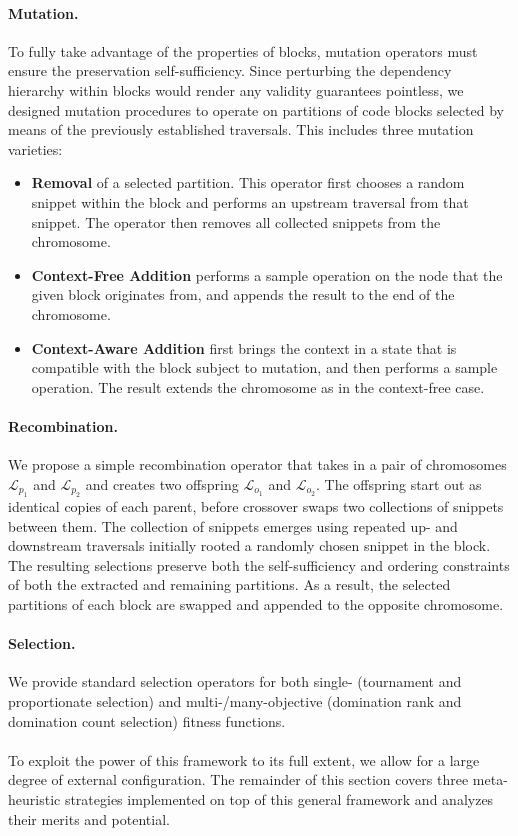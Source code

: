 \paragraph{Mutation.} To fully take advantage of the properties of blocks,
mutation operators must ensure the preservation self-sufficiency.
Since perturbing the dependency hierarchy within blocks
would render any validity guarantees pointless, we designed
mutation procedures to operate on partitions of code blocks selected by 
means of the previously established traversals.
This includes three mutation varieties:

\begin{itemize}
	\item \textbf{Removal} of a selected partition. This operator first chooses a random 
	snippet within the block and performs an upstream traversal from that snippet.
	The operator then removes all collected snippets from the chromosome.
	\item \textbf{Context-Free Addition} performs a sample operation
	on the node that the given block originates from, and appends the result to the end
	of the chromosome.
	\item \textbf{Context-Aware Addition} first brings the context in a state
	that is compatible with the block subject to mutation, and then performs a sample
	operation. The result extends the chromosome as in the context-free case.
\end{itemize}

\paragraph{Recombination.} We propose a simple recombination operator
that takes in a pair of chromosomes $\mathcal{L}_{p_1}$ and $\mathcal{L}_{p_2}$
and creates two offspring  $\mathcal{L}_{o_1}$ and $\mathcal{L}_{o_2}$.
The offspring start out as identical copies of each parent, before
crossover swaps two collections of snippets between them.
The collection of snippets emerges using repeated up- and downstream
traversals initially rooted a randomly chosen snippet in the block.
The resulting selections preserve both the self-sufficiency and
ordering constraints of both the extracted and remaining partitions.
As a result, the selected partitions of each block are swapped and appended
to the opposite chromosome.

\paragraph{Selection.} We provide standard selection operators for both
single- (tournament and proportionate selection) and
multi-/many-objective (domination rank and domination count selection) fitness functions.
\\\\
To exploit the power of this framework to its full extent,
we allow for a large degree of external configuration.
The remainder of this section covers three meta-heuristic
strategies implemented on top of this general framework and analyzes
their merits and potential.


